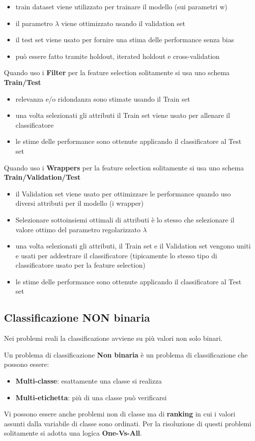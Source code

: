 \begin{itemize}
	\item train dataset viene utilizzato per trainare il modello (sui parametri w)
	\item il parametro $\lambda$ viene ottimizzato usando il validation set
	\item il test set viene usato per fornire una stima delle performance senza bias
	\item può essere fatto tramite holdout, iterated holdout e cross-validation
\end{itemize}
\noindent
Quando uso i \textbf{Filter} per la feature selection solitamente si usa uno schema \textbf{Train/Test}
\begin{itemize}
	\item relevanza e/o ridondanza sono stimate usando il Train set
	\item una volta selezionati gli attributi il Train set viene usato per allenare il classificatore
	\item le stime delle performance sono ottenute applicando il classificatore al Test set
\end{itemize}
\noindent
Quando uso i \textbf{Wrappers} per la feature selection solitamente si usa uno schema \textbf{Train/Validation/Test}
\begin{itemize}
	\item il Validation set viene usato per ottimizzare le performance quando uso diversi attributi per il modello (i wrapper)
	\item Selezionare sottoinsiemi ottimali di attributi è lo stesso che selezionare il valore ottimo del parametro regolarizzato $\lambda$
	\item una volta selezionati gli attributi, il Train set e il Validation set vengono uniti e usati per addestrare il classificatore (tipicamente lo stesso tipo di classificatore usato per la feature selection)
	\item le stime delle performance sono ottenute applicando il classificatore al Test set
\end{itemize}

\subsection{Classificazione NON binaria}
Nei problemi reali la classificazione avviene su pi\`u valori non solo binari.
\begin{defn}
	Un problema di classificazione \textbf{Non binaria} è un problema di classificazione che possono essere:
	\begin{itemize}
		\item \textbf{Multi-classe}: esattamente una classe si realizza
		\item \textbf{Multi-etichetta}: pi\`u di una classe pu\`o verificarsi
	\end{itemize}
\end{defn}
Vi possono essere anche problemi non di classe ma di \textbf{ranking} in cui i valori assunti dalla variabile di classe sono ordinati.
Per la risoluzione di questi problemi solitamente si adotta una logica \textbf{One-Vs-All}.

